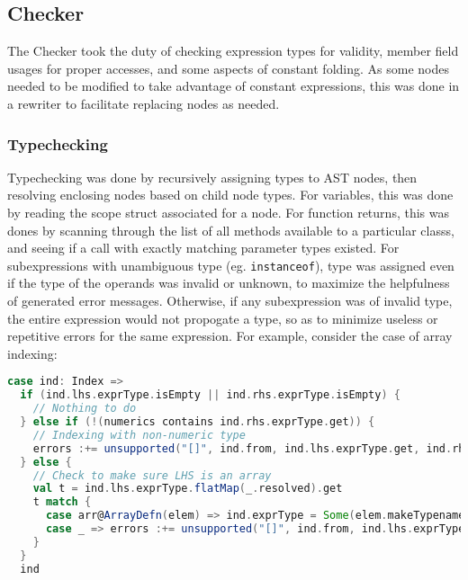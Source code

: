 \documentclass{article}
\begin{document}
\subsection{Checker}
The Checker took the duty of checking expression types for validity, member field usages for proper accesses, and some aspects of constant folding.
As some nodes needed to be modified to take advantage of constant expressions, this was done in a rewriter to facilitate replacing nodes as needed.

\subsubsection{Typechecking}
Typechecking was done by recursively assigning types to AST nodes, then resolving enclosing nodes based on child node types. For variables,
this was done by reading the scope struct associated for a node. For function returns, this was dones by scanning through the list of
all methods available to a particular classs, and seeing if a call with exactly matching parameter types existed. For subexpressions with
unambiguous type (eg. \texttt{instanceof}), type was assigned even if the type of the operands was invalid or unknown, to maximize the
helpfulness of generated error messages. Otherwise, if any subexpression was of invalid type, the entire expression would not propogate
a type, so as to minimize useless or repetitive errors for the same expression. For example, consider the case of array indexing:

\begin{lstlisting}[language=Scala]
case ind: Index =>
  if (ind.lhs.exprType.isEmpty || ind.rhs.exprType.isEmpty) {
    // Nothing to do
  } else if (!(numerics contains ind.rhs.exprType.get)) {
    // Indexing with non-numeric type
    errors :+= unsupported("[]", ind.from, ind.lhs.exprType.get, ind.rhs.exprType.get)
  } else {
    // Check to make sure LHS is an array
    val t = ind.lhs.exprType.flatMap(_.resolved).get
    t match {
      case arr@ArrayDefn(elem) => ind.exprType = Some(elem.makeTypename)
      case _ => errors :+= unsupported("[]", ind.from, ind.lhs.exprType.get, ind.rhs.exprType.get)
    }
  }
  ind
\end{lstlisting}
\end{document}
